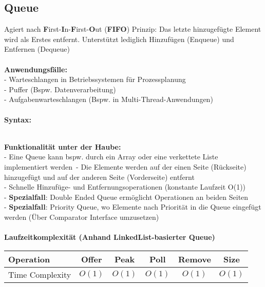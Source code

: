 \documentclass[../main.tex]{subfiles}
\begin{document}
	\subsection{Queue}
	Agiert nach \textbf{F}irst-\textbf{I}n-\textbf{F}irst-\textbf{O}ut (\textbf{FIFO}) Prinzip: Das letzte hinzugefügte Element wird als Erstes entfernt.
	Unterstützt lediglich Hinzufügen (Enqueue) und Entfernen (Dequeue)
	\\\\
	\textbf{Anwendungsfälle:}\\
	- Warteschlangen in Betriebssystemen für Prozessplanung\\
	- Puffer (Bspw. Datenverarbeitung)\\
	- Aufgabenwarteschlangen (Bspw. in Multi-Thread-Anwendungen)\\\\
	\textbf{Syntax:}
	 
	\\
	\textbf{Funktionalität unter der Haube:}\\
	- Eine Queue kann bspw. durch ein Array oder eine verkettete Liste implementiert werden\
	- Die Elemente werden auf der einen Seite (Rückseite) hinzugefügt und auf der anderen Seite (Vorderseite) entfernt\\
	- Schnelle Hinzufüge- und Entfernungsoperationen (konstante Laufzeit O(1))\\
	- \textbf{Spezialfall}: Double Ended Queue ermöglicht Operationen an beiden Seiten\\
	- \textbf{Spezialfall}: Priority Queue, wo Elemente nach Priorität in die Queue eingefügt werden (Über Comparator Interface umzusetzen)\\\\
	\textbf{Laufzeitkomplexität (Anhand LinkedList-basierter Queue)}\\
	\begin{table}[ht]
		\centering
		\begin{tabular}{l *{5}{c}}
			\toprule
			Operation & Offer & Peak & Poll & Remove & Size  \\
			\midrule
			Time Complexity & $O(1)$ & $O(1)$ & $O(1)$ & $O(1)$ & $O(1)$\\
			\bottomrule
		\end{tabular}
	\end{table}
	\clearpage
\end{document}
